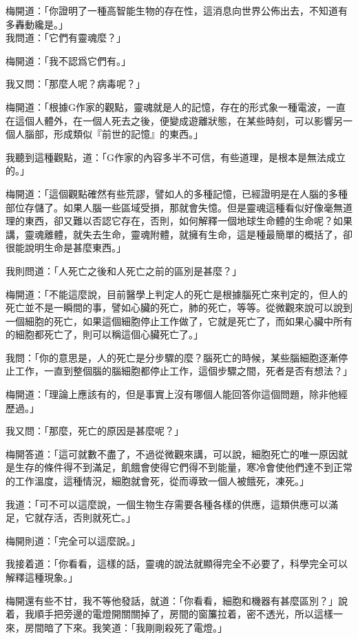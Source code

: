 梅開道：「你證明了一種高智能生物的存在性，這消息向世界公佈出去，不知道有多轟動纔是。」
\\


我問道：「它們有靈魂麼？」

梅開道：「我不認爲它們有。」

我又問：「那麼人呢？病毒呢？」

梅開道：「根據G作家的觀點，靈魂就是人的記憶，存在的形式象一種電波，一直在這個人體外，在一個人死去之後，便變成遊離狀態，在某些時刻，可以影響另一個人腦部，形成類似『前世的記憶』的東西。」

我聽到這種觀點，道：「G作家的內容多半不可信，有些道理，是根本是無法成立的。」

梅開道：「這個觀點確然有些荒謬，譬如人的多種記憶，已經證明是在人腦的多種部位存儲了。如果人腦一些區域受損，那就會失憶。但是靈魂這種看似好像毫無道理的東西，卻又難以否認它存在，否則，如何解釋一個地球生命體的生命呢？如果講，靈魂離體，就失去生命，靈魂附體，就擁有生命，這是種最簡單的概括了，卻很能說明生命是甚麼東西。」

我則問道：「人死亡之後和人死亡之前的區別是甚麼？」

梅開道：「不能這麼說，目前醫學上判定人的死亡是根據腦死亡來判定的，但人的死亡並不是一瞬間的事，譬如心臟的死亡，肺的死亡，等等。從微觀來說可以說到一個細胞的死亡，如果這個細胞停止工作做了，它就是死亡了，而如果心臟中所有的細胞都死亡了，則可以稱這個心臟死亡了。」

我問：「你的意思是，人的死亡是分步驟的麼？腦死亡的時候，某些腦細胞逐漸停止工作，一直到整個腦的腦細胞都停止工作，這個步驟之間，死者是否有想法？」

梅開道：「理論上應該有的，但是事實上沒有哪個人能回答你這個問題，除非他經歷過。」

我又問：「那麼，死亡的原因是甚麼呢？」

梅開答道：「這可就數不盡了，不過從微觀來講，可以說，細胞死亡的唯一原因就是生存的條件得不到滿足，飢餓會使得它們得不到能量，寒冷會使他們達不到正常的工作溫度，這種情況，細胞就會死，從而導致一個人被餓死，凍死。」

我道：「可不可以這麼說，一個生物生存需要各種各樣的供應，這類供應可以滿足，它就存活，否則就死亡。」

梅開則道：「完全可以這麼說。」

我接着道：「你看看，這樣的話，靈魂的說法就顯得完全不必要了，科學完全可以解釋這種現象。」

梅開還有些不甘，我不等他發話，就道：「你看看，細胞和機器有甚麼區別？」說着，我順手把旁邊的電燈開關關掉了，房間的窗簾拉着，密不透光，所以這樣一來，房間暗了下來。我笑道：「我剛剛殺死了電燈。」

